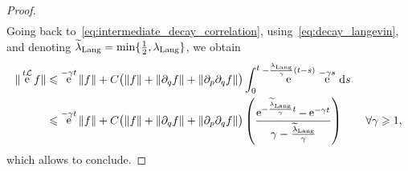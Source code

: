 \documentclass[11pt,a4paper]{article}
\DeclareMathOperator{\e}{e}
\renewcommand{\d}{\mathrm d}
\theoremstyle{plain}
\numberwithin{equation}{section}
\renewcommand{\leq}{\leqslant}
\renewcommand{\geq}{\geqslant}
\begin{document}
\begin{proof}
\begin{align*}
    \end{align*}
    Going back to~\eqref{eq:intermediate_decay_correlation}, using~\eqref{eq:decay_langevin},
    and denoting $\widetilde \lambda_{\rm Lang} = \min \{\frac{1}{2}, \lambda_{\rm Lang} \}$,
    we obtain
    \begin{align*}
        \norm*{ \e^{t \mathcal L} f}
        &\leq  \e^{-\gamma t} \norm{f}
        + C  \bigl( \norm{f} + \norm{\partial_q f} + \norm{\partial_p \partial_q f}\bigr) \int_{0}^{t} \e^{-\frac{\lambda_{\rm Lang}}{\gamma}(t-s)}  \, \e^{-\gamma s} \, \d s \\
        &\leq  \e^{-\gamma t} \norm{f}
        + C \bigl( \norm{f} + \norm{\partial_q f} + \norm{\partial_p \partial_q f}\bigr)
        \left( \frac{\e^{- \frac{\widetilde \lambda_{\rm Lang}}{\gamma}t} - \e^{- \gamma t}}{\gamma - \frac{\widetilde \lambda_{\rm Lang}}{\gamma}} \right) \qquad \forall \gamma \geq 1,
    \end{align*}
    which allows to conclude.
\end{proof}
\end{document}

